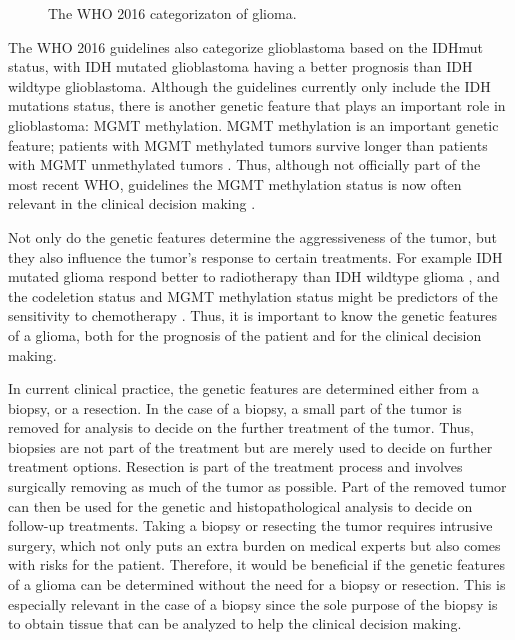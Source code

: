 \begin{figure}[hbt]
    \centering
    \caption{The WHO 2016 categorizaton of glioma.}\label{fig:intro_glioma_categorization}
\end{figure}

The \gls{WHO} 2016 guidelines also categorize \gls{glioblastoma} based on the \gls{IDHmut} status, with \gls{IDH} mutated \gls{glioblastoma} having a better prognosis than \gls{IDH} wildtype \gls{glioblastoma}.
Although the guidelines currently only include the \gls{IDH} mutations status, there is another genetic feature that plays an important role in \gls{glioblastoma}: \gls{MGMT} methylation.
\gls{MGMT} methylation is an important genetic feature; patients with \gls{MGMT} methylated \glspl{tumor} survive longer than patients with \gls{MGMT} unmethylated \glspl{tumor} \autocite{martinez2007MGMT, gessler2018MGMT, weller2009molecularGBM}.
Thus, although not officially part of the most recent \gls{WHO}, guidelines the \gls{MGMT} methylation status is now often relevant in the clinical decision making \cite{molinaro2019geneticepidemiology}.

Not only do the genetic features determine the aggressiveness of the \gls{tumor}, but they also influence the \gls{tumor}'s response to certain treatments.
For example \gls{IDH} mutated \gls{glioma} respond better to radiotherapy than \gls{IDH} wildtype \gls{glioma} \autocite{juratli2015IDHtreatment}, and the \gls{codeletion} status and \gls{MGMT} methylation status might be predictors of the sensitivity to chemotherapy \autocite{idbaih2007markersresponse}.
Thus, it is important to know the genetic features of a \gls{glioma}, both for the prognosis of the patient and for the clinical decision making.

In current clinical practice, the genetic features are determined either from a biopsy, or a resection.
In the case of a biopsy, a small part of the \gls{tumor} is removed for analysis to decide on the further treatment of the \gls{tumor}.
Thus, biopsies are not part of the treatment but are merely used to decide on further treatment options.
Resection is part of the treatment process and involves surgically removing as much of the \gls{tumor} as possible.
Part of the removed \gls{tumor} can then be used for the genetic and histopathological analysis to decide on follow-up treatments.
Taking a biopsy or resecting the \gls{tumor} requires intrusive surgery, which not only puts an extra burden on medical experts but also comes with risks for the patient.
Therefore, it would be beneficial if the genetic features of a \gls{glioma} can be determined without the need for a biopsy or resection.
This is especially relevant in the case of a biopsy since the sole purpose of the biopsy is to obtain tissue that can be analyzed to help the clinical decision making.

